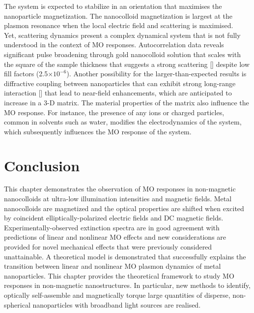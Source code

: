 The system is expected to stabilize in an orientation that maximises the nanoparticle magnetization. The nanocolloid magnetization is largest at the plasmon resonance when the local electric field and scattering is maximised.
\\\indent Yet, scattering dynamics present a complex dynamical system that is not fully understood in the context of MO responses. Autocorrelation data reveals significant pulse broadening through gold nanocolloid solution that scales with the square of the sample thickness that suggests a strong scattering [\cite{Genack}] despite low fill factors (2.5$\times 10^{-6}$). 
Another possibility for the larger-than-expected results is diffractive coupling between nanoparticles that can exhibit strong long-range interaction [\cite{Barnes2}] that lead to near-field enhancements, which are anticipated to increase in a 3-D matrix. The material properties of the matrix also influence the MO response. For instance, the presence of any ions or charged particles, common in solvents such as water, modifies the electrodynamics of the system, which subsequently influences the MO response of the system.
\section{Conclusion}
\indent This chapter demonstrates the observation of MO responses in non-magnetic nanocolloids at ultra-low illumination intensities and magnetic fields. Metal nanocolloids are magnetized and the optical properties are shifted when excited by coincident elliptically-polarized electric fields and DC magnetic fields. Experimentally-observed extinction spectra are in good agreement with predictions of linear and nonlinear MO effects and new considerations are provided for novel mechanical effects that were previously considered unattainable. A theoretical model is demonstrated that successfully explains the transition between linear and nonlinear MO plasmon dynamics of metal nanoparticles. This chapter provides the theoretical framework to study MO responses in non-magnetic nanostructures. In particular, new methods to identify, optically self-assemble and magnetically torque large quantities of disperse, non-spherical nanoparticles with broadband light sources are realised.

